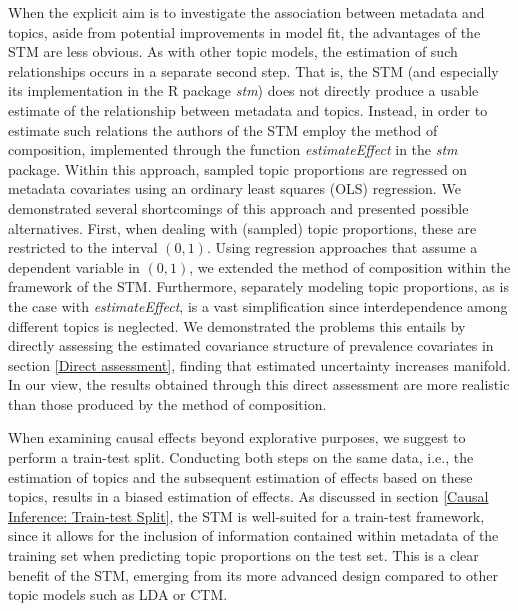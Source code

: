 When the explicit aim is to investigate the association between metadata and topics, aside from potential improvements in model fit, the advantages of the STM are less obvious. As with other topic models, the estimation of such relationships occurs in a separate second step. That is, the STM (and especially its implementation in the R package \textit{stm}) does not directly produce a usable estimate of the relationship between metadata and topics. Instead, in order to estimate such relations the authors of the STM employ the method of composition, implemented through the function \textit{estimateEffect} in the \textit{stm} package. Within this approach, sampled topic proportions are regressed on metadata covariates using an ordinary least squares (OLS) regression. We demonstrated several shortcomings of this approach and presented possible alternatives. First, when dealing with (sampled) topic proportions, these are restricted to the interval $(0,1)$. Using regression approaches that assume a dependent variable in $(0,1)$, we extended the method of composition within the framework of the STM. Furthermore, separately modeling topic proportions, as is the case with \textit{estimateEffect}, is a vast simplification since interdependence among different topics is neglected. We demonstrated the problems this entails by directly assessing the estimated covariance structure of prevalence covariates in section \ref{Direct assessment}, finding that estimated uncertainty increases manifold. In our view, the results obtained through this direct assessment are more realistic than those produced by the method of composition.

When examining causal effects beyond explorative purposes, we suggest to perform a train-test split. Conducting both steps on the same data, i.e., the estimation of topics and the subsequent estimation of effects based on these topics, results in a biased estimation of effects. As discussed in section \ref{Causal Inference: Train-test Split}, the STM is well-suited for a train-test framework, since it allows for the inclusion of information contained within metadata of the training set when predicting topic proportions on the test set. This is a clear benefit of the STM, emerging from its more advanced design compared to other topic models such as LDA or CTM.

